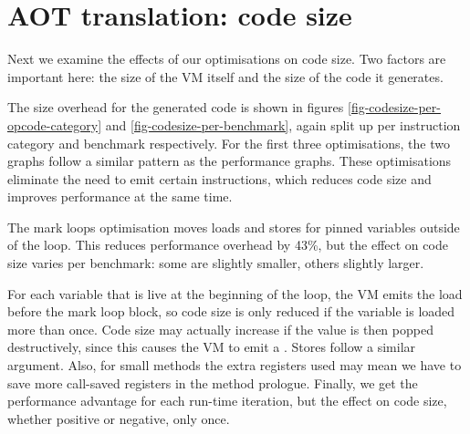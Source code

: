 

\section{AOT translation: code size}
\label{sec-evaluation-aot-translation-code-size}
Next we examine the effects of our optimisations on code size. Two factors are important here: the size of the VM itself and the size of the code it generates.

The size overhead for the generated code is shown in figures \ref{fig-codesize-per-opcode-category} and \ref{fig-codesize-per-benchmark}, again split up per instruction category and benchmark respectively. For the first three optimisations, the two graphs follow a similar pattern as the performance graphs. These optimisations eliminate the need to emit certain instructions, which reduces code size and improves performance at the same time.

The mark loops optimisation moves loads and stores for pinned variables outside of the loop. This reduces performance overhead by 43\%, but the effect on code size varies per benchmark: some are slightly smaller, others slightly larger.

For each variable that is live at the beginning of the loop, the VM emits the load before the mark loop block, so code size is only reduced if the variable is loaded more than once. Code size may actually increase if the value is then popped destructively, since this causes the VM to emit a . Stores follow a similar argument. Also, for small methods the extra registers used may mean we have to save more call-saved registers in the method prologue. Finally, we get the performance advantage for each run-time iteration, but the effect on code size, whether positive or negative, only once.


